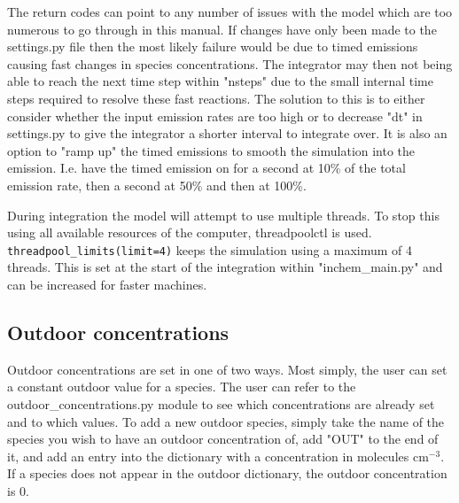 \documentclass[a4paper]{refart}
\begin{document}
The return codes can point to any number of issues with the model which are too numerous to go through in this manual. If changes have only been made to the settings.py file then the most likely failure would be due to timed emissions causing fast changes in species concentrations. The integrator may then not being able to reach the next time step within "nsteps" due to the small internal time steps required to resolve these fast reactions. The solution to this is to either consider whether the input emission rates are too high or to decrease "dt" in settings.py to give the integrator a shorter interval to integrate over. It is also an option to "ramp up" the timed emissions to smooth the simulation into the emission. I.e. have the timed emission on for a second at 10\% of the total emission rate, then a second at 50\% and then at 100\%. 



During integration the model will attempt to use multiple threads. To stop this using all available resources of the computer, threadpoolctl is used. \texttt{threadpool\_limits(limit=4)} keeps the simulation using a maximum of 4 threads. This is set at the start of the integration within "inchem\_main.py" and can be increased for faster machines.


\subsection{Outdoor concentrations}\label{outdoor_concentrations.py}
Outdoor concentrations are set in one of two ways. Most simply, the user can set a constant outdoor value for a species. The user can refer to the outdoor\_concentrations.py module to see which concentrations are already set and to which values. To add a new outdoor species, simply  take the name of the species you wish to have an outdoor concentration of, add "OUT" to the end of it, and add an entry into the dictionary with a concentration in molecules cm$^{-3}$. If a species does not appear in the outdoor dictionary, the outdoor concentration is 0.
\end{document}
